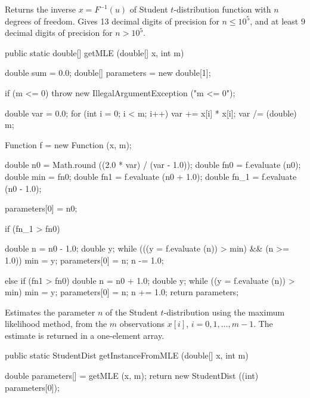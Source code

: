   \begin{tabb}
  Returns the inverse $x = F^{-1}(u)$ of
  Student $t$-distribution function with $n$ degrees of freedom.
  Gives 13 decimal digits of precision for $n \le 10^5$,
  and at least 9 decimal digits of precision for $n >  10^5$.
  \end{tabb}
\begin{code}

   public static double[] getMLE (double[] x, int m)\begin{hide} {
      double sum = 0.0;
      double[] parameters = new double[1];

      if (m <= 0)
         throw new IllegalArgumentException ("m <= 0");

      double var = 0.0;
      for (int i = 0; i < m; i++)
         var += x[i] * x[i];
      var /= (double) m;

      Function f = new Function (x, m);

      double n0 = Math.round ((2.0 * var) / (var - 1.0));
      double fn0 = f.evaluate (n0);
      double min = fn0;
      double fn1 = f.evaluate (n0 + 1.0);
      double fn_1 = f.evaluate (n0 - 1.0);

      parameters[0] = n0;

      if (fn_1 > fn0) {
         double n = n0 - 1.0;
         double y;
         while (((y = f.evaluate (n)) > min) && (n >= 1.0)) {
            min = y;
            parameters[0] = n;
            n -= 1.0;
         }

      } else if (fn1 > fn0) {
         double n = n0 + 1.0;
         double y;
         while ((y = f.evaluate (n)) > min) {
            min = y;
            parameters[0] = n;
            n += 1.0;
         }
      }
      return parameters;
   }\end{hide}
\end{code}
\begin{tabb}
   Estimates the parameter $n$ of the Student $t$-distribution
   using the maximum likelihood method, from the $m$ observations
   $x[i]$, $i = 0, 1,\ldots, m-1$. The estimate is returned in a one-element
   array.
\end{tabb}
\begin{htmlonly}
\end{htmlonly}
\begin{code}

   public static StudentDist getInstanceFromMLE (double[] x, int m)\begin{hide} {
      double parameters[] = getMLE (x, m);
      return new StudentDist ((int) parameters[0]);
   }\end{hide}
\end{code}
